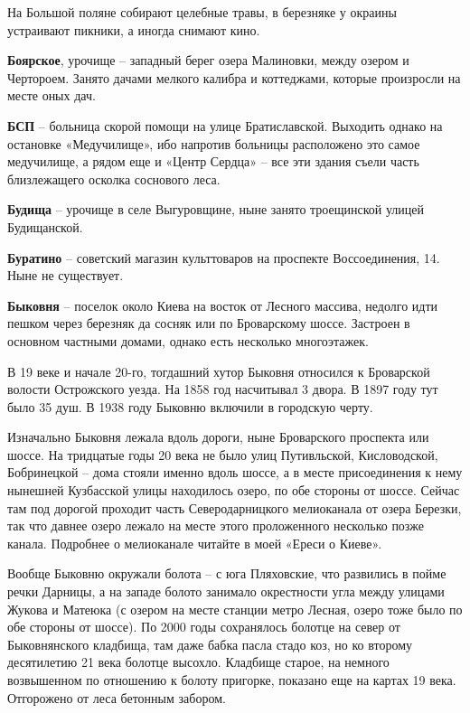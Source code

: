 На Большой поляне собирают целебные травы, в березняке у окраины устраивают пикники, а иногда снимают кино.\\

\medskip

\textbf{Боярское}, урочище – западный берег озера Малиновки, между озером и Чертороем. Занято дачами мелкого калибра и коттеджами, которые произросли на месте оных дач.\\

\medskip


\textbf{БСП} – больница скорой помощи на улице Братиславской. Выходить однако на остановке «Медучилище», ибо напротив больницы расположено это самое медучилище, а рядом еще и «Центр Сердца» – все эти здания съели часть близлежащего осколка соснового леса.\\

\medskip

\textbf{Будища} – урочище в селе Выгуровщине, ныне занято троещинской улицей Будищанской.\\

\medskip

\textbf{Буратино} – советский магазин культтоваров на проспекте Воссоединения, 14. Ныне не существует.\\

\medskip

\textbf{Быковня} – поселок около Киева на восток от Лесного массива, недолго идти пешком через березняк да сосняк или по Броварскому шоссе. Застроен в основном частными домами, однако есть несколько многоэтажек.

В 19 веке и начале 20-го, тогдашний хутор Быковня относился к Броварской волости Ост\-рожского уезда. На 1858 год насчитывал 3 двора. В 1897 году тут было 35 душ. В 1938 году Быковню включили в городскую черту.
 
Изначально Быковня лежала вдоль дороги, ныне Броварского проспекта или шоссе. На тридцатые годы 20 века не было улиц Путивльской, Кисловодской, Бобринецкой – дома стояли именно вдоль шоссе, а в месте присоединения к нему нынешней Кузбасской улицы находилось озеро, по обе стороны от шоссе. Сейчас там под дорогой проходит часть Северодарницкого мелиоканала от озера Березки, так что давнее озеро лежало на месте этого проложенного несколько позже канала. Подробнее о мелиоканале читайте в моей «Ереси о Киеве».
   
Вообще Быковню окружали болота – с юга Пляховские, что развились в пойме речки Дарницы, а на западе болото занимало окрестности угла между улицами Жукова и Матеюка (с озером на месте станции метро Лесная, озеро тоже было по обе стороны от шоссе). По 2000 годы сохранялось болотце на север от Быковнянского кладбища, там даже бабка пасла стадо коз, но ко второму десятилетию 21 века болотце высохло. Кладбище старое, на немного возвышенном по отношению к болоту пригорке, показано еще на картах 19 века. Отгорожено от леса бетонным забором.

